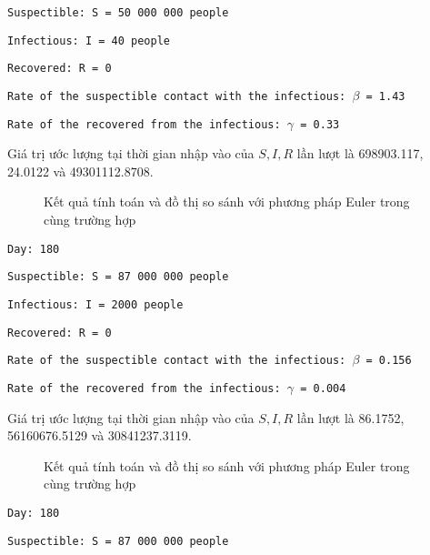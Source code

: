 \documentclass[a4paper]{article}
\begin{document}
\texttt{Suspectible: S = 50 000 000 people}

\texttt{Infectious: I = 40 people}

\texttt{Recovered: R = 0}

\texttt{Rate of the suspectible contact with the infectious: $\beta$ = 1.43}

\texttt{Rate of the recovered from the infectious: $\gamma$ = 0.33}

Giá trị ước lượng tại thời gian nhập vào của $S,I,R$ lần lượt là 698903.117, 24.0122 và 49301112.8708.
\begin{figure}[ht]
    \centering
    \newline
    \newline
    \newline
    \label{pic: test_SIR_1}
    \caption{Kết quả tính toán và đồ thị so sánh với phương pháp Euler trong cùng trường hợp}
\end{figure}

\newpage
\texttt{Day: 180}

\texttt{Suspectible: S = 87 000 000 people}

\texttt{Infectious: I = 2000 people}

\texttt{Recovered: R = 0}

\texttt{Rate of the suspectible contact with the infectious: $\beta$ = 0.156}

\texttt{Rate of the recovered from the infectious: $\gamma$ = 0.004}

Giá trị ước lượng tại thời gian nhập vào của $S,I,R$ lần lượt là 86.1752, 56160676.5129 và 30841237.3119.
\begin{figure}[ht]
    \centering
    \newpage
    \newline
    \newline
    \label{pic: test_SIR_1}
    \caption{Kết quả tính toán và đồ thị so sánh với phương pháp Euler trong cùng trường hợp}
\end{figure}

\newpage
\texttt{Day: 180}

\texttt{Suspectible: S = 87 000 000 people}
\end{document}
